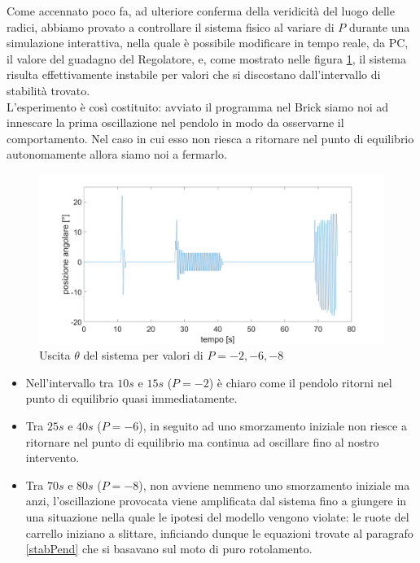 Come accennato poco fa, ad ulteriore conferma della veridicità del luogo delle radici, abbiamo provato a controllare il sistema fisico al variare di $P$ durante una simulazione interattiva, nella quale è possibile modificare in tempo reale, da PC, il valore del guadagno del Regolatore, e, come mostrato nelle figura \ref{variazioneGainP}, il sistema risulta effettivamente instabile per valori che si discostano dall'intervallo di stabilità trovato.\\
L'esperimento è così costituito: avviato il programma nel Brick siamo noi ad innescare la prima oscillazione nel pendolo in modo da osservarne il comportamento. Nel caso in cui esso non riesca a ritornare nel punto di equilibrio autonomamente allora siamo noi a fermarlo.
\begin{figure}[ht]
	\centering
	\includegraphics[width=\linewidth]{variazioneGainP.png}
	\caption{Uscita $\theta$ del sistema per valori di $P=-2,-6,-8$}
	\label{variazioneGainP}
\end{figure}
\begin{itemize}
	\item Nell'intervallo tra $10s$ e $15s$ ($P=-2$) è chiaro come il pendolo ritorni nel punto di equilibrio quasi immediatamente.
	\item Tra $25s$ e $40s$ ($P=-6$), in seguito ad uno smorzamento iniziale non riesce a ritornare nel punto di equilibrio ma continua ad oscillare fino al nostro intervento.
	\item Tra $70s$ e $80s$ ($P=-8$), non avviene nemmeno uno smorzamento iniziale ma anzi, l'oscillazione provocata viene amplificata dal sistema fino a giungere in una situazione nella quale le ipotesi del modello vengono violate: le ruote del carrello iniziano a slittare, inficiando dunque le equazioni trovate al paragrafo \ref{stabPend} che si basavano sul moto di puro rotolamento.
\end{itemize}

